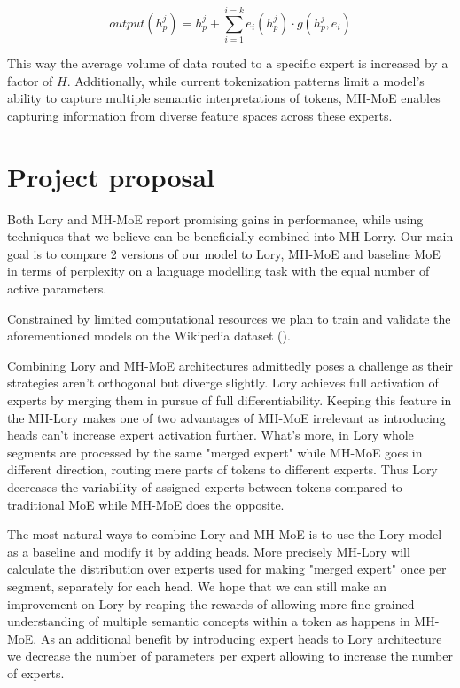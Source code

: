 \documentclass[12pt]{article}
\begin{document}
\[ output(h_p^j)= h_p^j + \sum_{i=1}^{i=k} e_i (h_p^j)  \cdot g(h_p^j,e_i)\]


This way the average volume of data routed to a specific expert is increased by a factor of $H$.
Additionally, while current tokenization patterns limit a model's ability to capture multiple semantic interpretations of tokens, MH-MoE enables capturing information from diverse feature spaces across these experts.


\section{Project proposal}
Both Lory and MH-MoE report promising gains in performance, while using techniques that we believe can be beneficially combined into MH-Lorry. Our main goal is to compare 2 versions of our model to Lory, MH-MoE and baseline MoE in terms of perplexity on a language modelling task with the equal number of active parameters.%

Constrained by limited computational resources we plan to train and validate the aforementioned models on the Wikipedia dataset (\cite{wikidump}). %

Combining Lory and MH-MoE architectures admittedly poses a challenge as their strategies aren't orthogonal but diverge slightly. Lory achieves full activation of experts by merging them in pursue of full differentiability. Keeping this feature in the MH-Lory makes one of two advantages of MH-MoE irrelevant as introducing heads can't increase expert activation further. What's more, in Lory whole segments are processed by the same "merged expert" while MH-MoE goes in different direction, routing mere parts of tokens to different experts. Thus Lory decreases the variability of assigned experts between tokens compared to traditional MoE while MH-MoE does the opposite.

The most natural ways to combine Lory and MH-MoE is to use the Lory model as a baseline and modify it by adding heads. More precisely MH-Lory will calculate the distribution over experts used for making "merged expert" once per segment, separately for each head. We hope that we can still make an improvement on Lory by reaping the rewards of allowing more fine-grained understanding of multiple semantic concepts within a token as happens in MH-MoE. As an additional benefit by introducing expert heads to Lory architecture we decrease the number of parameters per expert allowing to increase the number of experts.
\end{document}
